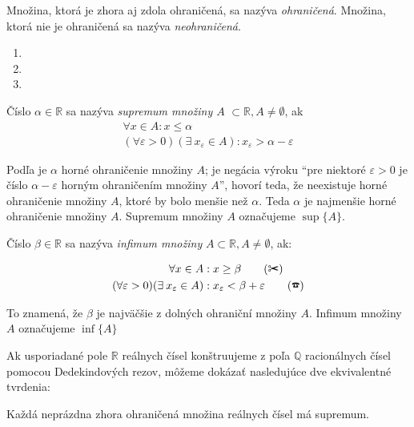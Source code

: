 Množina, ktorá je zhora aj zdola ohraničená, sa nazýva \textit{ohraničená}.
Množina, ktorá nie je ohraničená sa nazýva \textit{neohraničená}.

\begin{enumerate}[resume]
	\item {}
	\item {}
	\item {}
\end{enumerate}


Číslo $\alpha \in \mathbb{R}$ sa nazýva \textit{supremum množiny $A$}
$\subset \mathbb{R}, A \neq \emptyset$, ak
\begin{align}
\forall x \in A: x \leq \alpha \label{eq:supremum-i} \\
(\forall \varepsilon > 0) (\exists \: x_\varepsilon \in A):
x_\varepsilon > \alpha - \varepsilon
\end{align}

Podľa  je $\alpha$ horné ohraničenie množiny $A$;  je negácia
výroku ``pre niektoré $\varepsilon > 0$ je číslo $\alpha - \varepsilon$ horným
ohraničením množiny $A$'', hovorí teda, že neexistuje horné ohraničenie množiny
$A$, ktoré by bolo menšie než $\alpha$. Teda $\alpha$ je najmenšie horné
ohraničenie množiny $A$. Supremum množiny $A$ označujeme $\sup \{ A \}$.

Číslo $\beta \in \mathbb{R}$ sa nazýva \textit{infimum množiny} $A \subset
\mathbb{R}, A \neq \emptyset$, ak:

\begin{align*}
  \forall x \in A&: x \geq \beta \tag{\ding{34}} \\
  (\forall \varepsilon > 0) (\exists \: x_\varepsilon \in A)&:
  x_\varepsilon < \beta + \varepsilon \tag{\ding{37}}
\end{align*}

To znamená, že $\beta$ je najväčšie z dolných ohraniční množiny $A$. Infimum
množiny $A$ označujeme $\inf\{A\}$

Ak usporiadané pole $\mathbb{R}$ reálnych čísel konštruujeme z poľa
$\mathbb{Q}$ racionálnych čísel pomocou Dedekindových rezov, môžeme dokázať
nasledujúce dve ekvivalentné tvrdenia:

\begin{veta}
Každá neprázdna zhora ohraničená množina reálnych čísel má supremum.
\end{veta}

